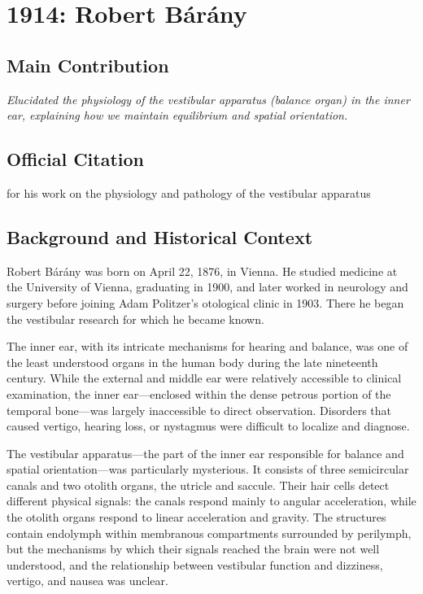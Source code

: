 \chapter[1914 --- Barany]{1914: Robert B\'ar\'any}
\label{ch:1914_robertbarany}
\section*{Main Contribution}
\textit{Elucidated the physiology of the vestibular apparatus (balance organ) in the inner ear, explaining how we maintain equilibrium and spatial orientation.}\cite{nobel-1914,lecture-1914}
\section{Official Citation}

for his work on the physiology and pathology of the vestibular apparatus

\section{Background and Historical Context}

Robert B\'ar\'any was born on April 22, 1876, in Vienna. He studied medicine at the University of Vienna, graduating in 1900, and later worked in neurology and surgery before joining Adam Politzer's otological clinic in 1903. There he began the vestibular research for which he became known.\cite{barany-biographical}

The inner ear, with its intricate mechanisms for hearing and balance, was one of the least understood organs in the human body during the late nineteenth century. While the external and middle ear were relatively accessible to clinical examination, the inner ear---enclosed within the dense petrous portion of the temporal bone---was largely inaccessible to direct observation. Disorders that caused vertigo, hearing loss, or nystagmus were difficult to localize and diagnose.

The vestibular apparatus---the part of the inner ear responsible for balance and spatial orientation---was particularly mysterious. It consists of three semicircular canals and two otolith organs, the utricle and saccule. Their hair cells detect different physical signals: the canals respond mainly to angular acceleration, while the otolith organs respond to linear acceleration and gravity. The structures contain endolymph within membranous compartments surrounded by perilymph, but the mechanisms by which their signals reached the brain were not well understood, and the relationship between vestibular function and dizziness, vertigo, and nausea was unclear.

